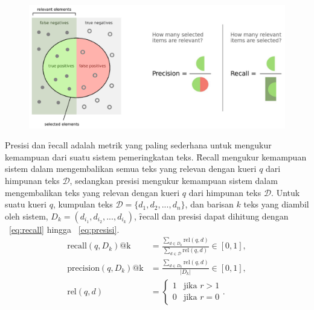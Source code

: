         \begin{figure}[!ht]
            \centering
            \includegraphics[width=1\textwidth]{assets/pics/recall-presisi.png}
            \label{fig:recall-precision}
        \end{figure}
        Presisi dan \f{recall} adalah metrik yang paling sederhana untuk mengukur kemampuan dari suatu sistem pemeringkatan teks. \f{Recall} mengukur kemampuan sistem dalam mengembalikan semua teks yang relevan dengan kueri $q$ dari himpunan teks $\mathcal{D}$, sedangkan presisi mengukur kemampuan sistem dalam mengembalikan teks yang relevan dengan kueri $q$ dari himpunan teks $\mathcal{D}$. Untuk suatu kueri $q$, kumpulan teks $\mathcal{D} = \{d_1, d_2, ..., d_n\}$, dan barisan $k$ teks yang diambil oleh sistem, $D_k = (d_{i_1}, d_{i_2}, ..., d_{i_k})$, \f{recall} dan presisi dapat dihitung dengan \equ~\ref{eq:recall} hingga \equ~\ref{eq:presisi}.
        \begin{align}
            \label{eq:recall}
            \text{recall}(q, D_k)\text{@k} &= \frac{\sum_{d \in D_k} \text{rel}(q, d)}{\sum_{d \in \mathcal{D}} \text{rel}(q, d)} \in [0, 1], \\
            \label{eq:presisi}
            \text{precision}(q, D_k)\text{@k} &= \frac{\sum_{d \in D_k} \text{rel}(q, d)}{|D_k|} \in [0, 1], \\
            \label{eq:rel}
            \text{rel}(q, d) &= \begin{cases} 
            1 & \text{jika } r > 1 \\
            0 & \text{jika } r = 0
            \end{cases}.
        \end{align}

